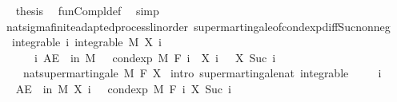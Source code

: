 \begin{isabellebody}
\ \ \isamarkupfalse%
\ {\isacharquery}{\kern0pt}thesis\ \isamarkupfalse%
\ fun{\isacharunderscore}{\kern0pt}Compl{\isacharunderscore}{\kern0pt}def\ \isamarkupfalse%
\ simp\isanewline
{}\isamarkupfalse%
%
\endisatagproof
{\isafoldproof}%
%
\isadelimproof
\isanewline
%
\endisadelimproof
\isanewline
{}\isamarkupfalse%
\ {\isacharparenleft}{\kern0pt}\ nat{\isacharunderscore}{\kern0pt}sigma{\isacharunderscore}{\kern0pt}finite{\isacharunderscore}{\kern0pt}adapted{\isacharunderscore}{\kern0pt}process{\isacharunderscore}{\kern0pt}linorder{\isacharparenright}{\kern0pt}\ supermartingale{\isacharunderscore}{\kern0pt}of{\isacharunderscore}{\kern0pt}cond{\isacharunderscore}{\kern0pt}exp{\isacharunderscore}{\kern0pt}diff{\isacharunderscore}{\kern0pt}Suc{\isacharunderscore}{\kern0pt}nonneg{\isacharcolon}{\kern0pt}\isanewline
\ \ \ integrable{\isacharcolon}{\kern0pt}\ {\isachardoublequoteopen}{\isasymAnd}i{\isachardot}{\kern0pt}\ integrable\ M\ {\isacharparenleft}{\kern0pt}X\ i{\isacharparenright}{\kern0pt}{\isachardoublequoteclose}\ \isanewline
\ \ \ \ \ \ \ {\isachardoublequoteopen}{\isasymAnd}i{\isachardot}{\kern0pt}\ AE\ {\isasymxi}\ in\ M{\isachardot}{\kern0pt}\ {}\ {\isasymle}\ cond{\isacharunderscore}{\kern0pt}exp\ M\ {\isacharparenleft}{\kern0pt}F\ i{\isacharparenright}{\kern0pt}\ {\isacharparenleft}{\kern0pt}{\isasymlambda}{\isasymxi}{\isachardot}{\kern0pt}\ X\ i\ {\isasymxi}\ {\isacharminus}{\kern0pt}\ X\ {\isacharparenleft}{\kern0pt}Suc\ i{\isacharparenright}{\kern0pt}\ {\isasymxi}{\isacharparenright}{\kern0pt}\ {\isasymxi}{\isachardoublequoteclose}\ \isanewline
\ \ \ \ \ {\isachardoublequoteopen}nat{\isacharunderscore}{\kern0pt}supermartingale\ M\ F\ X{\isachardoublequoteclose}\isanewline
%
\isadelimproof
%
\endisadelimproof
%
\isatagproof
{}\isamarkupfalse%
\ {\isacharparenleft}{\kern0pt}intro\ supermartingale{\isacharunderscore}{\kern0pt}nat\ integrable{\isacharparenright}{\kern0pt}\ \isanewline
\ \ \isamarkupfalse%
\ i\ \isanewline
\ \ \isamarkupfalse%
\ {\isachardoublequoteopen}AE\ {\isasymxi}\ in\ M{\isachardot}{\kern0pt}\ X\ i\ {\isasymxi}\ {\isasymge}\ cond{\isacharunderscore}{\kern0pt}exp\ M\ {\isacharparenleft}{\kern0pt}F\ i{\isacharparenright}{\kern0pt}\ {\isacharparenleft}{\kern0pt}X\ {\isacharparenleft}{\kern0pt}Suc\ i{\isacharparenright}{\kern0pt}{\isacharparenright}{\kern0pt}\ {\isasymxi}{\isachardoublequoteclose}\ \isamarkupfalse%

\end{isabellebody}
